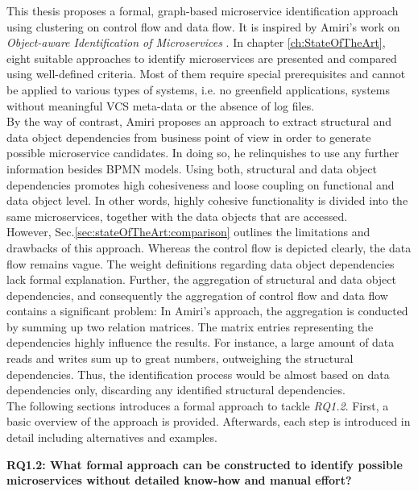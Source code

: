 \noindent
This thesis proposes a formal, graph-based microservice identification approach using clustering on control flow and data flow. It is  inspired by Amiri’s work on \textit{Object-aware Identification of Microservices} \cite{ObjectAwareAmiri}. In chapter \ref{ch:StateOfTheArt}, eight suitable approaches to identify microservices are presented and compared using well-defined criteria. Most of them require special prerequisites and cannot be applied to various types of systems, i.e. no greenfield applications, systems without meaningful VCS meta-data or the absence of log files.
\\
By the way of contrast, Amiri proposes an approach to extract structural and data object dependencies from business point of view in order to generate possible microservice candidates. In doing so, he relinquishes to use any further information besides BPMN models. Using both, structural and data object dependencies promotes high cohesiveness and loose coupling on functional and data object level. In other words, highly cohesive functionality is divided into the same microservices, together with the data objects that are accessed. \\
However, Sec.\ref{sec:stateOfTheArt:comparison} outlines the limitations and drawbacks of this approach. Whereas the control flow is depicted clearly, the data flow remains vague. The weight definitions regarding data object dependencies lack formal explanation. Further, the aggregation of structural and data object dependencies, and consequently the aggregation of control flow and data flow contains a significant problem: In Amiri's approach, the aggregation is conducted by summing up two relation matrices. The matrix entries representing the dependencies highly influence the results. For instance, a large amount of data reads and writes sum up to great numbers, outweighing the structural dependencies. Thus, the identification process would be almost based on data dependencies only, discarding any identified structural dependencies. \\
The following sections introduces a formal approach to tackle \textit{RQ1.2}. First, a basic overview of the approach is provided. Afterwards, each step is introduced in detail including alternatives and examples. 




\vspace{0.5cm}
\par
\begingroup
\leftskip=1cm
\rightskip=1cm

\noindent
\textbf{RQ1.2: What formal approach can be constructed to identify possible microservices without detailed know-how and manual effort? }

